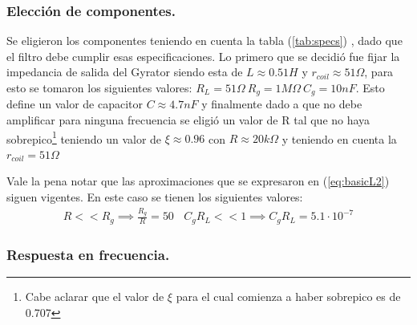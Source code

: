 \documentclass[a4paper]{article}
\begin{document}
\subsubsection{Elección de componentes.}
Se eligieron los componentes teniendo en cuenta la tabla (\ref{tab:specs}) , dado que el filtro debe cumplir esas especificaciones.
Lo primero que se decidió fue fijar la impedancia de salida del Gyrator siendo esta de $L \approx 0.51H $ y $r_{coil} \approx 51\Omega $, para esto se tomaron los siguientes valores: $R_L = 51\Omega \ R_g = 1M\Omega \ C_g = 10nF$.
 Esto define un valor de capacitor $C \approx 4.7nF$ y finalmente dado a que no debe amplificar para ninguna frecuencia se eligió un valor de R tal que no haya sobrepico\footnote{Cabe aclarar que el valor de $\xi$ para el cual comienza a haber sobrepico es de 0.707} teniendo un valor de $\xi \approx 0.96 $ con $R \approx 20k\Omega $ y teniendo en cuenta la $r_{coil} = 51\Omega$  

Vale la pena notar que las aproximaciones que se expresaron en (\ref{eq:basicL2}) siguen vigentes. En este caso se tienen los siguientes valores:
\begin{align}  R<<R_g \implies  \frac{R_g}{R}=  50 \ \ \ \ C_gR_L << 1 \implies C_gR_L =5.1 \cdot 10^{-7} \end{align}

\subsubsection{Respuesta en frecuencia.}
\end{document}
